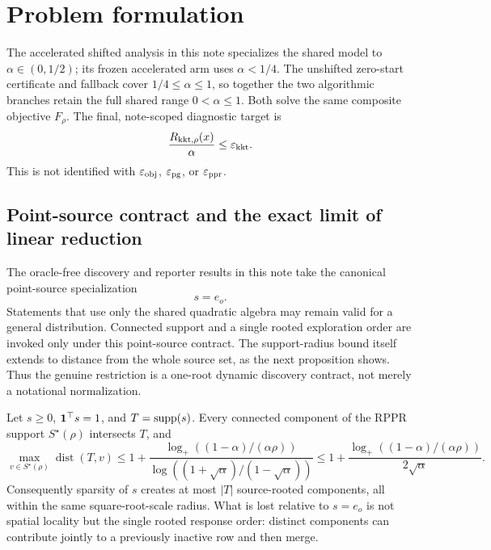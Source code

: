\section{Problem formulation}



The accelerated shifted analysis in this note specializes the shared model to
$\alpha\in(0,1/2)$; its frozen accelerated arm uses $\alpha<1/4$.  The
unshifted zero-start certificate and fallback cover
$1/4\leq\alpha\leq1$, so together the two algorithmic branches retain the
full shared range $0<\alpha\leq1$.  Both solve the same composite objective
$F_\rho$.  The final, note-scoped diagnostic target is
\begin{equation}
  \frac{R_{\mathrm{kkt},\rho}(x)}{\alpha}\leq\varepsilon_{\mathrm{kkt}}.
  \label{eq:aesp-cd-target}
\end{equation}
This is not identified with $\varepsilon_{\mathrm{obj}}$, $\varepsilon_{\mathrm{pg}}$, or $\varepsilon_{\mathrm{ppr}}$.

\subsection{Point-source contract and the exact limit of linear reduction}

The oracle-free discovery and reporter results in this note take the canonical
point-source specialization
\begin{equation*}
 s=e_o.
\end{equation*}
Statements that use only the shared quadratic algebra may remain valid for a
general distribution.  Connected support and a single rooted exploration
order are invoked only under this point-source contract.  The support-radius
bound itself extends to distance from the whole source set, as the next
proposition shows.  Thus the genuine restriction is a one-root dynamic
discovery contract, not merely a notational normalization.

\begin{proposition}
\label{prop:aesp-cd-sparse-source-radius}
Let $s\geq0$, $\mathbf{1}^\top s=1$, and $T=\operatorname{supp}(s)$.  Every connected
component of the RPPR support $S^\star(\rho)$ intersects $T$, and
\begin{equation}
 \max_{v\in S^\star(\rho)}\operatorname{dist}(T,v)
 \leq
 1+\frac{\log_+((1-\alpha)/(\alpha\rho))}
 {\log((1+\sqrt\alpha)/(1-\sqrt\alpha))}
 \leq
 1+\frac{\log_+((1-\alpha)/(\alpha\rho))}{2\sqrt\alpha}.
 \label{eq:aesp-cd-sparse-source-radius}
\end{equation}
Consequently sparsity of $s$ creates at most $|T|$ source-rooted
components, all within the same square-root-scale radius.  What is lost
relative to $s=e_o$ is not spatial locality but the single rooted response
order: distinct components can contribute jointly to a previously inactive
row and then merge.
\end{proposition}


